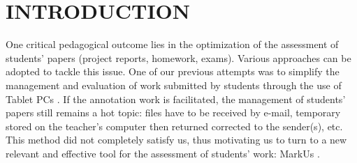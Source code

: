 \documentclass[twocolumn,10pt]{asme2e}
\begin{document}


\section*{INTRODUCTION}


One critical pedagogical outcome lies in the optimization of the assessment of students' papers (project reports, homework, exams). Various approaches can be adopted to tackle this issue. One of our previous attempts was to simplify the management and evaluation of work submitted by students through the use of Tablet PCs \cite{magnin-tice-2010}. If the annotation work is facilitated, the management of students' papers still remains a hot topic: files have to be received by e-mail, temporary stored on the teacher's computer then returned corrected to the sender(s), etc. This method did not completely satisfy us, thus motivating us to turn to a new relevant and effective tool for the assessment of students' work: MarkUs \cite{markus}.
\end{document}
